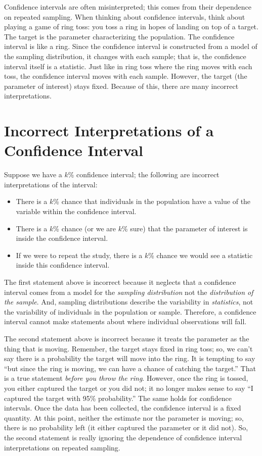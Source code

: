 \documentclass[
  letterpaper,
  DIV=11,
  numbers=noendperiod]{scrreprt}
\providecommand{\tightlist}{%
  \setlength{\itemsep}{0pt}\setlength{\parskip}{0pt}}\usepackage{longtable,booktabs,array}
\theoremstyle{definition}
\theoremstyle{definition}
\theoremstyle{plain}
\theoremstyle{remark}
\begin{document}
Confidence intervals are often misinterpreted; this comes from their
dependence on repeated sampling. When thinking about confidence
intervals, think about playing a game of ring toss: you toss a ring in
hopes of landing on top of a target. The target is the parameter
characterizing the population. The confidence interval is like a ring.
Since the confidence interval is constructed from a model of the
sampling distribution, it changes with each sample; that is, the
confidence interval itself is a statistic. Just like in ring toss where
the ring moves with each toss, the confidence interval moves with each
sample. However, the target (the parameter of interest) stays fixed.
Because of this, there are many incorrect interpretations.

\section{Incorrect Interpretations of a Confidence
Interval}\label{incorrect-interpretations-of-a-confidence-interval}

Suppose we have a \(k\)\% confidence interval; the following are
incorrect interpretations of the interval:

\begin{itemize}
\tightlist
\item
  There is a \(k\)\% chance that individuals in the population have a
  value of the variable within the confidence interval.
\item
  There is a \(k\)\% chance (or we are \(k\)\% sure) that the parameter
  of interest is inside the confidence interval.
\item
  If we were to repeat the study, there is a \(k\)\% chance we would see
  a statistic inside this confidence interval.
\end{itemize}

The first statement above is incorrect because it neglects that a
confidence interval comes from a model for the \emph{sampling
distribution} not the \emph{distribution of the sample}. And, sampling
distributions describe the variability in \emph{statistics}, not the
variability of individuals in the population or sample. Therefore, a
confidence interval cannot make statements about where individual
observations will fall.

The second statement above is incorrect because it treats the parameter
as the thing that is moving. Remember, the target stays fixed in ring
toss; so, we can't say there is a probability the target will move into
the ring. It is tempting to say ``but since the ring is moving, we can
have a chance of catching the target.'' That is a true statement
\emph{before you throw the ring}. However, once the ring is tossed, you
either captured the target or you did not; it no longer makes sense to
say ``I captured the target with 95\% probability.'' The same holds for
confidence intervals. Once the data has been collected, the confidence
interval is a fixed quantity. At this point, neither the estimate nor
the parameter is moving; so, there is no probability left (it either
captured the parameter or it did not). So, the second statement is
really ignoring the dependence of confidence interval interpretations on
repeated sampling.
\end{document}
